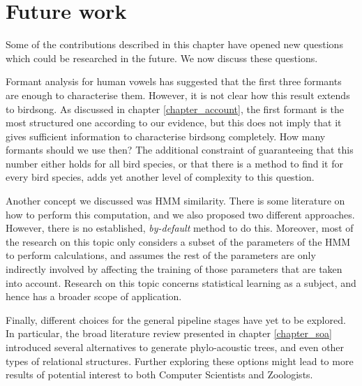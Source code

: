 \documentclass[../main.tex]{subfiles}
\begin{document}
\section{Future work} \label{section_future}
Some of the contributions described in this chapter have opened new questions which could be researched in the future. We now discuss these questions.
\par Formant analysis for human vowels has suggested that the first three formants are enough to characterise them. However, it is not clear how this result extends to birdsong. As discussed in chapter \ref{chapter_account}, the first formant is the most structured one according to our evidence, but this does not imply that it gives sufficient information to characterise birdsong completely. How many formants should we use then? The additional constraint of guaranteeing that this number either holds for all bird species, or that there is a method to find it for every bird species, adds yet another level of complexity to this question.
\par Another concept we discussed was HMM similarity. There is some literature on how to perform this computation, and we also proposed two different approaches. However, there is no established, \emph{by-default} method to do this. Moreover, most of the research on this topic only considers a subset of the parameters of the HMM to perform calculations, and assumes the rest of the parameters are only indirectly involved by affecting the training of those parameters that are taken into account. Research on this topic concerns statistical learning as a subject, and hence has a broader scope of application.
\par Finally, different choices for the general pipeline stages have yet to be explored. In particular, the broad literature review presented in chapter \ref{chapter_soa} introduced several alternatives to generate phylo-acoustic trees, and even other types of relational structures. Further exploring these options might lead to more results of potential interest to both Computer Scientists and Zoologists.
\end{document}
